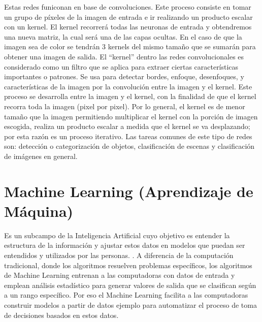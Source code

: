 Estas redes funiconan en base de convoluciones. Este proceso consiste en tomar un grupo de píxeles de la imagen de entrada e ir realizando un producto escalar con un kernel. El kernel recorrerá todas las neuronas de entrada y obtendremos una nueva matriz, la cual será una de las capas ocultas. En el caso de que la imagen sea de color se tendrán 3 kernels del mismo tamaño que se sumarán para obtener una imagen de salida. El ``kernel'' dentro las redes convolucionales es considerado como un filtro que se aplica para extraer ciertas características importantes o patrones. Se usa para detectar bordes, enfoque, desenfoques, y características de la imagen por la convolución entre la imagen y el kernel. Este proceso se desarrolla entre la imagen y el kernel, con la finalidad de que el kernel recorra toda la imagen (pixel por pixel). Por lo general, el kernel es de menor tamaño que la imagen permitiendo multiplicar el kernel con la porción de imagen escogida, realiza un producto escalar a medida que el kernel se va desplazando; por esta razón es un proceso iterativo. Las tareas comunes de este tipo de redes son: detección o categorización de objetos, clasificación de escenas y clasificación de imágenes en general.\\


\section{Machine Learning (Aprendizaje de Máquina)}
Es un subcampo de la Inteligencia Artificial cuyo objetivo es entender la estructura de la información y ajustar estos datos en modelos que puedan ser entendidos y utilizados por las personas. \cite{digitalocean:machinelearning}. A diferencia de la computación tradicional, donde los algoritmos resuelven problemas específicos, los algoritmos de Machine Learning entrenan a las computadoras con datos de entrada y emplean análisis estadístico para generar valores de salida que se clasifican según a un rango específico. Por eso el Machine Learning facilita a las computadoras construir modelos a partir de datos ejemplo para automatizar el proceso de toma de decisiones basados en estos datos.\\

